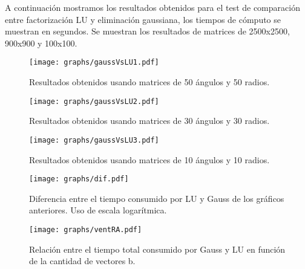 A continuación mostramos los resultados obtenidos para el test de comparación entre factorización LU y eliminación gaussiana, los tiempos de cómputo se muestran en segundos. Se muestran los resultados de matrices de 2500x2500, 900x900 y 100x100. 


\begin{figure}[H]{}
\centering
\texttt{[image: graphs/gaussVsLU1.pdf]}
\caption{Resultados obtenidos usando matrices de 50 ángulos y 50 radios.}
\label{gaussVsLU1}
\end{figure}

\begin{figure}[H]{}
\centering
\texttt{[image: graphs/gaussVsLU2.pdf]}
\caption{Resultados obtenidos usando matrices de 30 ángulos y 30 radios.}
\label{gaussVsLU2}
\end{figure}

\begin{figure}[H]{}
\centering
\texttt{[image: graphs/gaussVsLU3.pdf]}
\caption{Resultados obtenidos usando matrices de 10 ángulos y 10 radios.}
\label{gaussVsLU3}
\end{figure}

\begin{figure}[H]{}
\centering
\texttt{[image: graphs/dif.pdf]}
\caption{Diferencia entre el tiempo consumido por LU y Gauss de los gráficos anteriores. Uso de escala logarítmica.}
\label{gaussVsLU4}
\end{figure}


\begin{figure}[H]{}
\centering
\texttt{[image: graphs/ventRA.pdf]}
\caption{Relación entre el tiempo total consumido por Gauss y LU en función de la cantidad de vectores b.}
\label{gaussVsLU5}
\end{figure}
